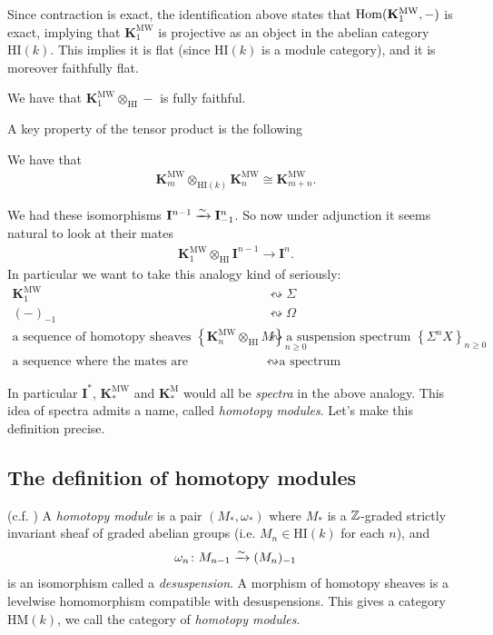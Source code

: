\documentclass[11pt,openany]{book}
\providecommand{\HI}{\mathrm{HI}}
\providecommand{\HM}{\mathrm{HM}}
\providecommand{\KM}{\mathbf{K}^\mathrm{M}}
\providecommand{\KMW}{\mathbf{K}^\mathrm{MW}}
\begin{document}
Since contraction is exact, the identification above states that $\Hom(\KMW_1,-)$ is exact, implying that $\KMW_1$ is projective as an object in the abelian category $\HI(k)$. This implies it is flat (since $\HI(k)$ is a module category), and it is moreover faithfully flat.

\begin{proposition}\label{prop:K1MW-ff} \cite[1.15]{Deglise-MH}
We have that $\KMW_1 \otimes_\HI -$ is fully faithful.
\end{proposition}


A key property of the tensor product is the following

\begin{proposition} We have that
\begin{align*}
    \KMW_m \otimes_{\HI(k)} \KMW_n \cong \KMW_{m+n}.
\end{align*}
\end{proposition}



We had these isomorphisms $\mathbf{I}^{n-1} \xrightarrow{\sim} \mathbf{I}^n_{-1}$. So now under adjunction it seems natural to look at their mates
\begin{align*}
    \KMW_1 \otimes_{\HI} \mathbf{I}^{n-1} \to \mathbf{I}^n.
\end{align*}
%
In particular we want to take this analogy kind of seriously:
\begin{align*}
    \KMW_1 &\leftrightsquigarrow \Sigma \\
    (-)_{-1} &\leftrightsquigarrow \Omega \\
    \text{a sequence of homotopy sheaves } \left\{ \KMW_n \otimes_\HI M \right\}_{n\ge 0} & \leftrightsquigarrow \text{a suspension spectrum } \left\{ \Sigma^n X \right\}_{n\ge 0} \\
    \text{a sequence where the mates are equivalences} & \leftrightsquigarrow \text{a spectrum}
\end{align*}

In particular $\mathbf{I}^\ast$, $\KMW_\ast$ and $\KM_\ast$ would all be \textit{spectra} in the above analogy. This idea of spectra admits a name, called \textit{homotopy modules}. Let's make this definition precise.

\subsection{The definition of homotopy modules}


\begin{definition} (c.f. \cite[3.4.1.2]{Feld-thesis}) A \textit{homotopy module} is a pair $(M_\ast, \omega_\ast)$ where $M_\ast$ is a $\mathbb{Z}$-graded strictly invariant sheaf of graded abelian groups (i.e. $M_n \in \HI(k)$ for each $n$), and
\begin{align*}
    \omega_n \colon M_{n-1} \xrightarrow{\sim} (M_n)_{-1}
\end{align*}
is an isomorphism called a \textit{desuspension}. A morphism of homotopy sheaves is a levelwise homomorphism compatible with desuspensions. This gives a category $\HM(k)$, we call the category of \textit{homotopy modules}.
\end{definition}
\end{document}
